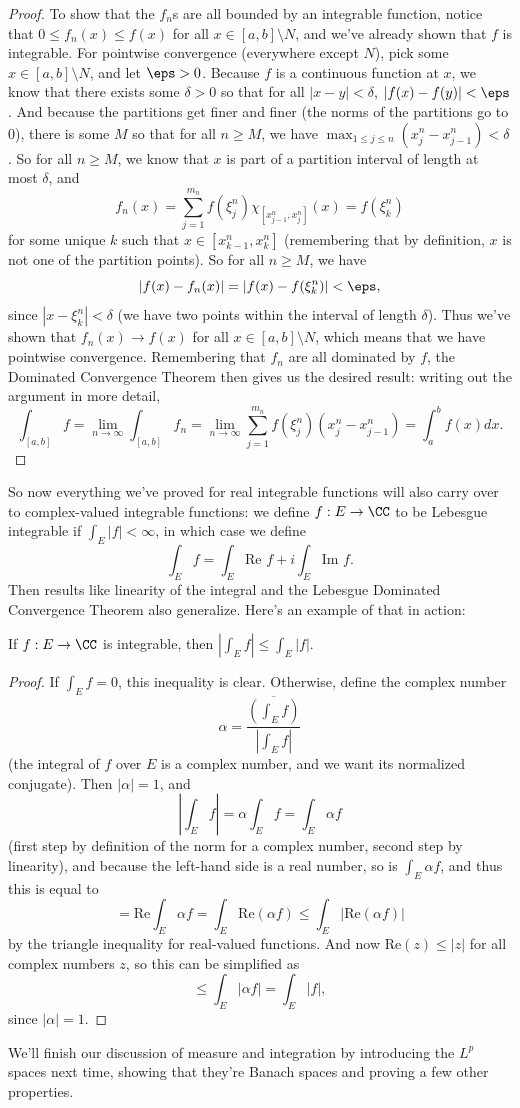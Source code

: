 \begin{proof}
To show that the $f_n$s are all bounded by an integrable function, notice that $0 \le f_n(x) \le f(x)$ for all $x \in [a, b] \setminus N$, and we've already shown that $f$ is integrable. For pointwise convergence (everywhere except $N$), pick some $x \in [a, b] \setminus N$, and let $\eps > 0$. Because $f$ is a continuous function at $x$, we know that there exists some $\delta > 0$ so that for all $|x-y| < \delta$, $|f(x) - f(y)| < \eps$. And because the partitions get finer and finer (the norms of the partitions go to $0$), there is some $M$ so that for all $n \ge M$, we have $\max_{1 \le j \le n} (x_j^n - x_{j-1}^n) < \delta$. So for all $n \ge M$, we know that $x$ is part of a partition interval of length at most $\delta$, and 
\[
    f_n(x) = \sum_{j=1}^{m_n} f(\xi_j^n) \chi_{[x_{j-1}^n, x_j^n]}(x) = f(\xi_k^n)
\]
for some unique $k$ such that $x \in [x_{k-1}^n, x_k^n]$ (remembering that by definition, $x$ is not one of the partition points). So for all $n \ge M$, we have 
\[
    |f(x) - f_n(x)| = |f(x) - f(\xi_k^n)| < \eps,
\]
since $|x - \xi_k^n| < \delta$ (we have two points within the interval of length $\delta$). Thus we've shown that $f_n(x) \to f(x)$ for all $x \in [a, b] \setminus N$, which means that we have pointwise convergence. Remembering that $f_n$ are all dominated by $f$, the Dominated Convergence Theorem then gives us the desired result: writing out the argument in more detail,
\[
    \int_{[a, b]} f = \lim_{n \to \infty} \int_{[a, b]} f_n = \lim_{n \to \infty} \sum_{j=1}^{m_n} f(\xi_j^n) (x_j^n - x_{j-1}^n) = \int_a^b f(x) dx.
\]
\end{proof}

So now everything we've proved for real integrable functions will also carry over to complex-valued integrable functions: we define $f: E \to \CC$ to be Lebesgue integrable if $\int_E |f| < \infty$, in which case we define 
\[
    \int_E f = \int_E \text{Re } f + i \int_E \text{Im } f.
\]
Then results like linearity of the integral and the Lebesgue Dominated Convergence Theorem also generalize. Here's an example of that in action:

\begin{proposition}
If $f: E \to \CC$ is integrable, then $\left|\int_E f\right| \le \int_E |f|$.
\end{proposition}
\begin{proof}
If $\int_E f = 0$, this inequality is clear. Otherwise, define the complex number 
\[
    \alpha = \frac{\overline{\left(\int_E f\right)}}{\left|\int_E f\right|}
\]
(the integral of $f$ over $E$ is a complex number, and we want its normalized conjugate). Then $|\alpha| = 1$, and 
\[
    \left|\int_E f\right| = \alpha \int_E f = \int_E \alpha f
\]
(first step by definition of the norm for a complex number, second step by linearity), and because the left-hand side is a real number, so is $\int_E \alpha f$, and thus this is equal to 
\[
    = \text{Re} \int_E \alpha f = \int_E \text{Re}(\alpha f) \le \int_E \left|\text{Re}(\alpha f)\right|  
\]
by the triangle inequality for real-valued functions. And now $\text{Re}(z) \le |z|$ for all complex numbers $z$, so this can be simplified as
\[
    \le \int_E |\alpha f| = \int_E |f|,
\]
since $|\alpha| = 1$.
\end{proof}

We'll finish our discussion of measure and integration by introducing the $L^p$ spaces next time, showing that they're Banach spaces and proving a few other properties.